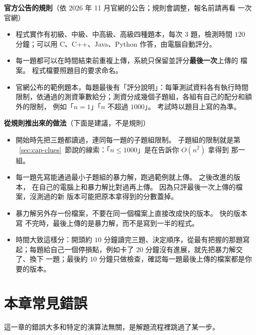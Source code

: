 \begin{apcsnote}
\textbf{官方公告的規則}（依 2026 年 11 月官網的公告；規則會調整，報名前請再看
一次官網）

\begin{itemize}
\item 程式實作有初級、中級、中高級、高級四種題本，每次 $3$ 題，檢測時間
$120$ 分鐘；可以用 C、C++、Java、Python 作答，由電腦自動評分。
\item 每一題都可以在時間結束前重複上傳，系統只保留並評分\textbf{最後一次}上傳的
檔案。 程式檔要照題目的要求命名。
\item 官網公布的範例題本，每題最後有「評分說明」：每筆測試資料各有執行時間
限制，依通過的測資筆數給分；測資分成幾個子題組，各組有自己的配分和額外的限制，
例如「$n = 1$」「$n$ 不超過 $1000$」。 考試時以題目上寫的為準。
\end{itemize}

\textbf{從規則推出來的做法}（下面是建議，不是規則）

\begin{itemize}
\item 開始時先把三題都讀過，連同每一題的子題組限制。 子題組的限制就是第
~\ref{sec:cap-clues}~節說的線索：「$n \le 1000$」是在告訴你 $O(n^2)$ 拿得到
那一組。
\item 每一題先寫能通過最小子題組的暴力解，跑過範例就上傳。 之後改進的版本，
在自己的電腦上和暴力解比對過再上傳。 因為只評最後一次上傳的檔案，沒測過的新
版本可能把原本拿得到的分數蓋掉。
\item 暴力解另外存一份檔案，不要在同一個檔案上直接改成快的版本。 快的版本寫
不完時，最後上傳的是暴力解，而不是寫到一半的程式。
\item 時間大致這樣分：開頭約 $10$ 分鐘讀完三題、決定順序，從最有把握的那題寫
起；每題給自己一個停損點，例如卡了 $20$ 分鐘沒有進展，就先把暴力解交了、換下
一題；最後約 $10$ 分鐘只做檢查，確認每一題最後上傳的檔案都是你要的版本。
\end{itemize}
\end{apcsnote}

\section{本章常見錯誤}
\label{sec:cap-pitfalls}

這一章的錯誤大多和特定的演算法無關，是解題流程裡跳過了某一步。

